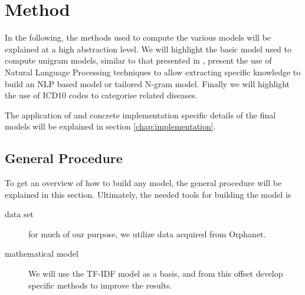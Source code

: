 \documentclass[10pt,letterpaper,two column,final]{article}
\begin{document}








\section{Method}
\label{chap:method}
In the following, the methods used to compute the various models will be
explained at a high abstraction level. We will highlight the basic model
used to compute unigram models, similar to that presented in
\cite{jensenandersen}, present the use of Natural Language Processing
techniques to allow extracting specific knowledge to build an NLP based
model or tailored N-gram model. Finally we will highlight the use of
ICD10 codes to categorise related diseases.

The application of and concrete implementation specific details of the
final models will be explained in section \ref{chap:implementation}.


\subsection{General Procedure}
To get an overview of how to build any model, the general procedure will
be explained in this section.
Ultimately, the needed tools for building the model is
\begin{description}
\item[data set] for much of our purpose, we utilize data acquired from
Orphanet.
\item[mathematical model] We will use the TF-IDF model as a basis, and
from this offset develop specific methods to improve the results.
\end{description}
\end{document}
